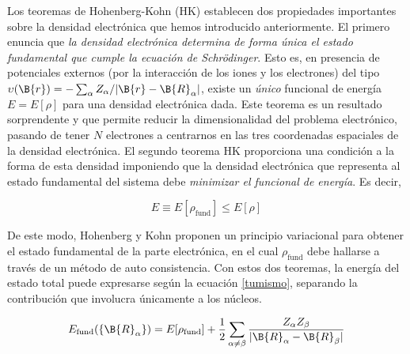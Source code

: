 Los teoremas de Hohenberg-Kohn (HK) establecen dos propiedades importantes sobre la densidad electrónica que hemos introducido anteriormente. El primero enuncia que \emph{la densidad electrónica determina de forma única el estado fundamental que cumple la ecuación de Schrödinger}. Esto es, en presencia de potenciales externos (por la interacción de los iones y los electrones) del tipo $\upsilon (\B{r}) = -\sum_\alpha Z_\alpha /|\B{r} - \B{R}_\alpha |$, existe un \emph{único} funcional de energía $E = E[\rho]$ para una densidad electrónica dada. Este teorema es un resultado sorprendente y que permite reducir la dimensionalidad del problema electrónico, pasando de tener $N$ electrones a centrarnos en las tres coordenadas espaciales de la densidad electrónica. El segundo teorema HK proporciona una condición a la forma de esta densidad imponiendo que la densidad electrónica que representa al estado fundamental del sistema debe \emph{minimizar el funcional de energía}. Es decir,

\begin{equation}
    E \equiv E[\rho_\text{fund}] \le E[\rho ]
\end{equation}

De este modo, Hohenberg y Kohn proponen un principio variacional para obtener el estado fundamental de la parte electrónica, en el cual $\rho_\text{fund}$ debe hallarse a través de un método de auto consistencia. Con estos dos teoremas, la energía del estado total puede expresarse según la ecuación \ref{tumismo}, separando la contribución que involucra únicamente a los núcleos.

\begin{equation}\label{tumismo}
    E_\text{fund} (\{ \B{R}_\alpha \}) = E[\rho_\text{fund}] + \frac{1}{2} \sum _{\alpha \neq \beta } \frac{Z_\alpha Z_\beta }{|\B{R}_\alpha - \B{R}_\beta |}
\end{equation}
